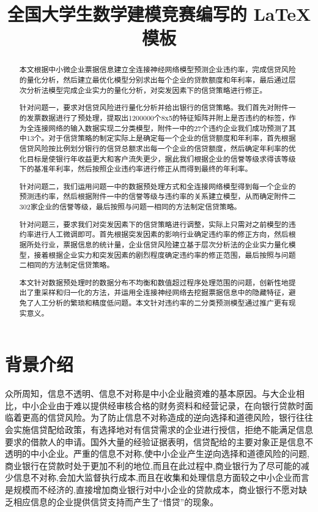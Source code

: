 \documentclass{cumcmthesis}
\title{全国大学生数学建模竞赛编写的 \LaTeX{} 模板}
\begin{document}
 \maketitle
 \begin{abstract}
    本文根据中小微企业票据信息建立全连接神经网络模型预测企业违约率，完成信贷风险的量化分析，然后建立最优化模型分别求出每个企业的贷款额度和年利率，最后通过层次分析法模型完成企业实力的量化分析，对突发因素下的信贷策略进行修正。
    
    针对问题一，要求对信贷风险进行量化分析并给出银行的信贷策略。我们首先对附件一的发票数据进行了预处理，提取出1200000个8x5的特征矩阵并附上是否违约的标签，作为全连接网络的输入数据实现二分类模型，附件一中的27个违约企业我们成功预测了其中13个。对于信贷策略的制定实际上是确定每一个企业的信贷额度和年利率，首先根据信贷风险按比例划分银行的信贷总额求出每一个企业的信贷额度，然后确定年利率的优化目标是使银行年收益更大和客户流失更少，据此我们根据企业的信誉等级求得该等级下的基准年利率，然后按照企业违约率进行修正从而得到最终的年利率。
    
    针对问题二，我们运用问题一中的数据预处理方式和全连接网络模型得到每一个企业的预测违约率，然后根据附件一中的信誉等级与违约率的关系建立模型，从而确定附件二302家企业的信誉等级，最后按照与问题一相同的方法制定信贷策略。
    
    针对问题三，要求我们对突发因素下的信贷策略进行调整，实际上只需对之前模型的违约率进行人工微调即可。首先根据突发因素的影响行业确定违约率的修正方向，然后根据所处行业，票据信息的统计量，企业信贷风险建立基于层次分析法的企业实力量化模型，接着根据企业实力和突发因素的剧烈程度确定违约率的修正范围，最后按照与问题二相同的方法制定信贷策略。
    
    本文针对数据预处理时的数据分布不均衡和数值超过程序处理范围的问题，创新性地提出了重采样和归一化的方法，并运用全连接神经网络去挖掘票据信息中的隐藏特征，避免了人工分析的繁琐和精度低问题。本文针对违约率的二分类预测模型通过推广更有现实意义。
    

\end{abstract}



\section{背景介绍}

众所周知，信息不透明、信息不对称是中小企业融资难的基本原因。与大企业相比，中小企业由于难以提供经审核合格的财务资料和经营记录，在向银行贷款时面临着更高的信贷风险。为了防止信息不对称造成的逆向选择和道德风险，银行往往会实施信贷配给政策，有选择地对有信贷需求的企业进行授信，拒绝不能满足信息要求的借款人的申请。国外大量的经验证据表明，信贷配给的主要对象正是信息不透明的中小企业。严重的信息不对称,使中小企业产生逆向选择和道德风险的问题,商业银行在贷款时处于更加不利的地位,而且在此过程中,商业银行为了尽可能的减少信息不对称,会加大监督执行成本,而且在收集和处理信息方面较之中小企业而言是规模而不经济的,直接增加商业银行对中小企业的贷款成本，商业银行不愿对缺乏相应信息的企业提供信贷支持而产生了“惜贷”的现象。
\end{document}
